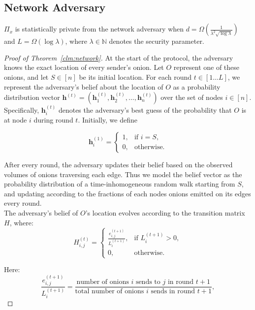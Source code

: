 \subsection{Network Adversary}

\begin{theorem} \label{clm:network}
    $\Pi_x$ is statistically private from the network adversary when $d = \Omega\left(\frac{1}{\lambda^2 \sqrt{\log \lambda}}\right)$ and $L = \Omega(\log \lambda)$, where $\lambda \in \mathbb{N}$ denotes the security parameter.\\
\end{theorem}


\begin{proof} [Proof of Theorem~\ref{clm:network}]
At the start of the protocol, the adversary knows the exact location of every sender's onion. Let $O$ represent one of these onions, and let $S \in [n]$ be its initial location. For each round $t \in [1 \dots L]$, we represent the adversary’s belief about the location of $O$ as a probability distribution vector $\mathbf{h}^{(t)} = (\mathbf{h}^{(t)}_1, \mathbf{h}^{(t)}_2, \dots, \mathbf{h}^{(t)}_n)$ over the set of nodes $i \in [n]$. Specifically, $\mathbf{h}^{(t)}_i$ denotes the adversary's best guess of the probability that $O$ is at node $i$ during round $t$. Initially, we define

$$
\mathbf{h}^{(1)}_i =
\begin{cases}
    1, & \text{if } i = S,\\
    0, & \text{otherwise.}
\end{cases}
$$

After every round, the adversary updates their belief based on the observed volumes of onions traversing each edge. Thus we model the belief vector as the probability distribution of a time-inhomogeneous random walk starting from $S$, and updating according to the fractions of each nodes onions emitted on its edges every round.\\

The adversary's belief of $O$'s location evolves according to the transition matrix $H$, where:
$$
H^{(t)}_{i,j} = 
\begin{cases}
    \frac{e^{(t + 1)}_{i,j}}{L^{(t + 1)}_i}, & \text{if $L^{(t + 1)}_i > 0$},\\
    0, & \text{otherwise.}
\end{cases}
$$

Here:
$$
\frac{e^{(t + 1)}_{i,j}}{L^{(t + 1)}_i} = \frac{\text{number of onions $i$ sends to $j$ in round $t + 1$}}{\text{total number of onions $i$ sends in round $t + 1$}},
$$


\end{proof}
